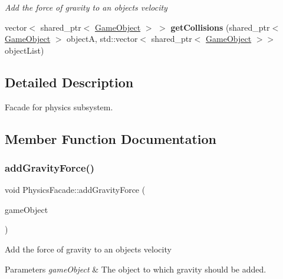 \begin{DoxyCompactItemize}
\begin{DoxyCompactList}\small\item\em Add the force of gravity to an objects velocity \end{DoxyCompactList}\item 
\mbox{\label{class_physics_facade_aaa92507f3546d858efdd7809f93750e1}} 
vector$<$ shared\+\_\+ptr$<$ \mbox{\hyperlink{class_game_object}{Game\+Object}} $>$ $>$ {\bfseries get\+Collisions} (shared\+\_\+ptr$<$ \mbox{\hyperlink{class_game_object}{Game\+Object}} $>$ objectA, std\+::vector$<$ shared\+\_\+ptr$<$ \mbox{\hyperlink{class_game_object}{Game\+Object}} $>$$>$ object\+List)
\end{DoxyCompactItemize}


\subsection{Detailed Description}
Facade for physics subsystem. 



\subsection{Member Function Documentation}
\mbox{\label{class_physics_facade_a0db40f3388826df2d9093f6a9ca90bd2}} 
\subsubsection{\texorpdfstring{add\+Gravity\+Force()}{addGravityForce()}}
{\footnotesize\ttfamily void Physics\+Facade\+::add\+Gravity\+Force (\begin{DoxyParamCaption}\item[{shared\+\_\+ptr$<$ \mbox{\hyperlink{class_game_object}{Game\+Object}} $>$}]{game\+Object }\end{DoxyParamCaption})}



Add the force of gravity to an objects velocity 


\begin{DoxyParams}{Parameters}
{\em game\+Object} & The object to which gravity should be added.\\
\hline
\end{DoxyParams}
\mbox{\label{class_physics_facade_a9d42e28b45cd542571e6f68cbefc41ff}} 
